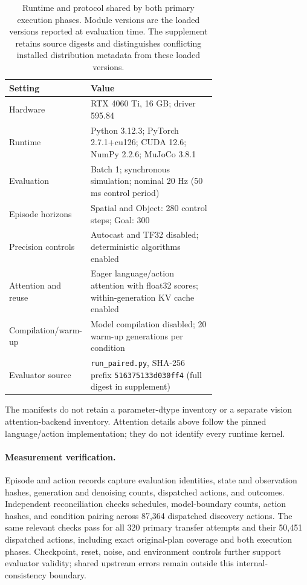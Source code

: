 \documentclass{article}
\begin{document}
\begin{table}[htbp]
\centering\small
\caption{Runtime and protocol shared by both primary execution phases.
Module versions are the loaded versions reported at evaluation time. The
supplement retains source digests and distinguishes conflicting installed
distribution metadata from these loaded versions.}
\label{tab:runtime}
\begin{tabular}{@{}lp{0.68\linewidth}@{}}
\toprule
Setting & Value\\
\midrule
Hardware & RTX 4060 Ti, 16 GB; driver 595.84\\
Runtime & Python 3.12.3; PyTorch 2.7.1+cu126; CUDA 12.6; NumPy 2.2.6; MuJoCo 3.8.1\\
Evaluation & Batch 1; synchronous simulation; nominal 20 Hz (50 ms control period)\\
Episode horizons & Spatial and Object: 280 control steps; Goal: 300\\
Precision controls & Autocast and TF32 disabled; deterministic algorithms enabled\\
Attention and reuse & Eager language/action attention with float32 scores; within-generation KV cache enabled\\
Compilation/warm-up & Model compilation disabled; 20 warm-up generations per condition\\
Evaluator source & \texttt{run\_paired.py}, SHA-256 prefix \texttt{516375133d030ff4} (full digest in supplement)\\
\bottomrule
\end{tabular}
\end{table}

The manifests do not retain a parameter-dtype inventory or a separate vision
attention-backend inventory. Attention details above follow the pinned
language/action implementation; they do not identify every runtime kernel.

\FloatBarrier
\paragraph{Measurement verification.}
\label{app:verification}

Episode and action records capture evaluation identities, state and observation
hashes, generation and denoising counts, dispatched actions, and outcomes.
Independent reconciliation checks schedules, model-boundary counts, action hashes,
and condition pairing across 87,364 dispatched discovery actions. The same
relevant checks pass for all 320 primary transfer attempts and their 50,451
dispatched actions, including exact original-plan coverage and both execution
phases. Checkpoint, reset, noise, and environment controls further support
evaluator validity; shared upstream errors remain outside this
internal-consistency boundary.
\end{document}
